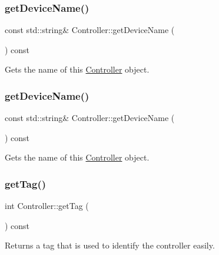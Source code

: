 \subsubsection{\texorpdfstring{get\+Device\+Name()}{getDeviceName()}\hspace{0.1cm}{\footnotesize\ttfamily [1/2]}}
{\footnotesize\ttfamily const std\+::string\& Controller\+::get\+Device\+Name (\begin{DoxyParamCaption}{ }\end{DoxyParamCaption}) const\hspace{0.3cm}{\ttfamily [inline]}}

Gets the name of this \hyperlink{classController}{Controller} object. \mbox{\label{classController_a58c7b72640130609ca3c039b256ce2b1}} 
\subsubsection{\texorpdfstring{get\+Device\+Name()}{getDeviceName()}\hspace{0.1cm}{\footnotesize\ttfamily [2/2]}}
{\footnotesize\ttfamily const std\+::string\& Controller\+::get\+Device\+Name (\begin{DoxyParamCaption}{ }\end{DoxyParamCaption}) const\hspace{0.3cm}{\ttfamily [inline]}}

Gets the name of this \hyperlink{classController}{Controller} object. \mbox{\label{classController_ae82854fd0c1abb1ebe9cd311b648a3d2}} 
\subsubsection{\texorpdfstring{get\+Tag()}{getTag()}\hspace{0.1cm}{\footnotesize\ttfamily [1/2]}}
{\footnotesize\ttfamily int Controller\+::get\+Tag (\begin{DoxyParamCaption}{ }\end{DoxyParamCaption}) const\hspace{0.3cm}{\ttfamily [inline]}}

Returns a tag that is used to identify the controller easily.

